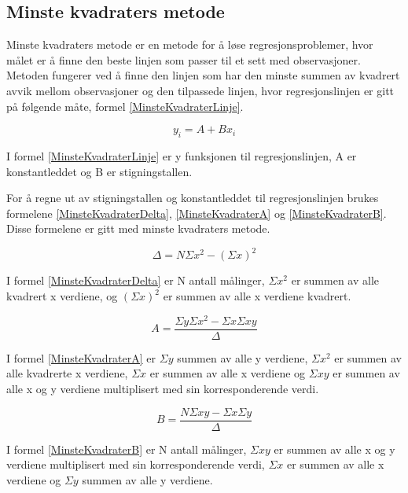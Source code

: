 \documentclass[twocolumn, 11pt]{article} %
\begin{document}
\subsection{Minste kvadraters metode}
Minste kvadraters metode er en metode for å løse regresjonsproblemer, hvor målet er å finne den beste linjen som passer til et sett med observasjoner. Metoden fungerer ved å finne den linjen som har den minste summen av kvadrert avvik mellom observasjoner og den tilpassede linjen, hvor regresjonslinjen er gitt på følgende måte, formel \eqref{MinsteKvadraterLinje}.

\begin{equation}
    y_i = A +Bx_i
    \label{MinsteKvadraterLinje}
\end{equation}

I formel \eqref{MinsteKvadraterLinje} er y funksjonen til regresjonslinjen, A er konstantleddet og B er stigningstallen. 

For å regne ut av stigningstallen og konstantleddet til regresjonslinjen brukes formelene \eqref{MinsteKvadraterDelta}, \eqref{MinsteKvadraterA} og \eqref{MinsteKvadraterB}. Disse formelene er gitt med minste kvadraters metode.

\begin{equation}
    \Delta = N \Sigma x^2  - (\Sigma x)^2
    \label{MinsteKvadraterDelta}
\end{equation}

I formel \eqref{MinsteKvadraterDelta} er N antall målinger, $\Sigma x^2$ er summen av alle kvadrert x verdiene, og $(\Sigma x)^2$ er summen av alle x verdiene kvadrert.

\begin{equation}
    A = \frac{\Sigma y \Sigma x^2 - \Sigma x \Sigma xy}{\Delta}
    \label{MinsteKvadraterA}
\end{equation}

I formel \eqref{MinsteKvadraterA} er $\Sigma y$ summen av alle y verdiene, $\Sigma x^2$ er summen av alle kvadrerte x verdiene, $\Sigma x$ er summen av alle x verdiene og $\Sigma xy$ er summen av alle x og y verdiene multiplisert med sin korresponderende verdi. 

\begin{equation}
    B = \frac{N \Sigma xy  - \Sigma x \Sigma y}{\Delta}
    \label{MinsteKvadraterB}
\end{equation}

I formel \eqref{MinsteKvadraterB} er N antall målinger, $\Sigma xy$ er summen av alle x og y verdiene multiplisert med sin korresponderende verdi, $\Sigma x$ er summen av alle x verdiene og $\Sigma y$ summen av alle y verdiene. 
\end{document}
